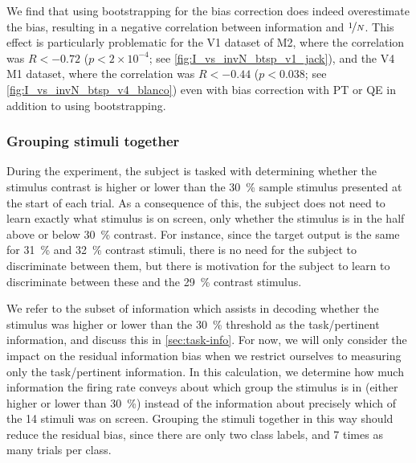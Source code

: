 We find that using bootstrapping for the bias correction does indeed overestimate the bias, resulting in a negative correlation between information and $\nicefrac{1}{N}$.
This effect is particularly problematic for the \ac{V1} dataset of \ac{M2}, where the correlation was $R<-0.72$ ($p < 2 \times 10^{-4}$; see \autoref{fig:I_vs_invN_btsp_v1_jack}), and the \ac{V4} \ac{M1} dataset, where the correlation was $R<-0.44$ ($p<0.038$; see \autoref{fig:I_vs_invN_btsp_v4_blanco}) even with bias correction with \ac{PT} or \ac{QE} in addition to using bootstrapping.


\subsubsection{Grouping stimuli together}
\label{sec:pl_bias_grouping}

During the experiment, the subject is tasked with determining whether the stimulus contrast is higher or lower than the \SI{30}{\percent} sample stimulus presented at the start of each trial.
As a consequence of this, the subject does not need to learn exactly what stimulus is on screen, only whether the stimulus is in the half above or below \SI{30}{\percent} contrast.
For instance, since the target output is the same for \SI{31}{\percent} and \SI{32}{\percent} contrast stimuli, there is no need for the subject to discriminate between them, but there is motivation for the subject to learn to discriminate between these and the \SI{29}{\percent} contrast stimulus.

We refer to the subset of information which assists in decoding whether the stimulus was higher or lower than the \SI{30}{\percent} threshold as the task\-/pertinent information, and discuss this in \autoref{sec:task-info}.
For now, we will only consider the impact on the residual information bias when we restrict ourselves to measuring only the task\-/pertinent information.
In this calculation, we determine how much information the firing rate conveys about which group the stimulus is in (either higher or lower than \SI{30}{\percent}) instead of the information about precisely which of the \num{14} stimuli was on screen.
Grouping the stimuli together in this way should reduce the residual bias, since there are only two class labels, and \num{7} times as many trials per class.


